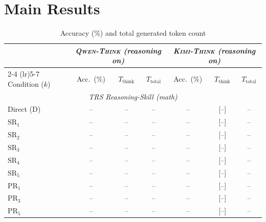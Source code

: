 \section{Main Results}
\label{sec:main-results}


\begin{table}[t]
  \caption{%
    Accuracy (\%) and total generated token count
  }
  \label{tab:main-results}
  \vskip 0.15in
  \begin{center}
  \begin{small}
  \begin{tabular}{lcccccc}
    \toprule
    & \multicolumn{3}{c}{\textit{\textsc{Qwen-Think} (reasoning on)}}
    & \multicolumn{3}{c}{\textit{\textsc{Kimi-Think} (reasoning on)}} \\
    \cmidrule(lr){2-4} \cmidrule(lr){5-7}
    Condition ($k$)
      & Acc.\ (\%) & $T_\mathrm{think}$ & $T_\mathrm{total}$
      & Acc.\ (\%) & $T_\mathrm{think}$ & $T_\mathrm{total}$ \\
    \midrule
    \multicolumn{7}{c}{\textit{TRS Reasoning-Skill (math)}} \\
    Direct (D)            & --   & --  & --  & --   & {[--]} & --  \\
    $\mathrm{SR}_1$       & --   & --  & --  & --   & {[--]} & --  \\
    $\mathrm{SR}_2$       & --   & --  & --  & --   & {[--]} & --  \\
    $\mathrm{SR}_3$       & --   & --  & --  & --   & {[--]} & --  \\
    $\mathrm{SR}_4$       & --   & --  & --  & --   & {[--]} & --  \\
    $\mathrm{SR}_5$       & --   & --  & --  & --   & {[--]} & --  \\
    \midrule
    $\mathrm{PR}_1$       & --   & --  & --  & --   & {[--]} & --  \\
    $\mathrm{PR}_3$       & --   & --  & --  & --   & {[--]} & --  \\
    $\mathrm{PR}_5$       & --   & --  & --  & --   & {[--]} & --  \\

\end{tabular}
\end{small}
\end{center}
\end{table}
